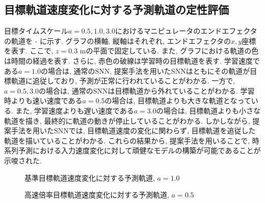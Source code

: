\subsection{目標軌道速度変化に対する予測軌道の定性評価}
目標タイムスケール$a=0.5, 1.0, 3.0$におけるマニピュレータのエンドエフェクタの軌道を - に示す.
グラフの横軸, 縦軸はそれぞれ, エンドエフェクタの$x, y$座標を表す.
ここで, $z=0.3$ mの平面で固定している.
また, グラフにおける軌道の色は時間の経過を表す.
さらに, 赤色の破線は学習時の目標軌道を表す.
学習速度である$a=1.0$の場合は, 通常のSNN, 提案手法を用いたSNNはともにその軌道が目標軌道に追従しており, 予測が正常に行われていることがわかる.
一方で, $a=0.5, 3.0$の場合は, 通常のSNNは目標軌道から外れていることがわかる.
学習時よりも速い速度である$a=0.5$の場合は, 目標軌道よりも大きな軌道となっている.
また, 学習速度よりも遅い速度である$a=3.0$の場合は, 目標軌道よりも小さな軌道を描き, 最終的に軌道の動きが停止していることがわかる.
しかしながら, 提案手法を用いたSNNでは, 目標軌道速度の変化に関わらず, 目標軌道を追従した軌道を描いていることがわかる.
これらの結果から, 提案手法を用いることで, 時系列予測における入力速度変化に対して頑健なモデルの構築が可能であることが示唆された.
\begin{figure}[htb]
    \centering

    \begin{minipage}{1.0\textwidth}
        \centering
        
    \end{minipage}

    \begin{minipage}{1.0\textwidth}
        \centering
        
    \end{minipage}

    \caption{基準目標軌道速度変化に対する予測軌道, $a=1.0$}
    \label{fig:result3:3:a1.0}
\end{figure}

\begin{figure}[htb]
    \centering
    \begin{minipage}{1.0\textwidth}
        \centering
        
    \end{minipage}

    \begin{minipage}{1.0\textwidth}
        \centering
        
    \end{minipage}

    \caption{高速倍率目標軌道速度変化に対する予測軌道, $a=0.5$}
    \label{fig:result3:3:a0.5}
\end{figure}


